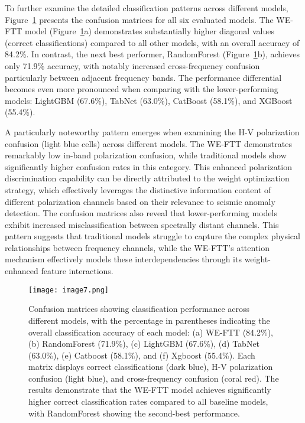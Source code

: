 \documentclass[fleqn,10pt]{wlscirep_mdpi_style}
\begin{document}
To further examine the detailed classification patterns across different models, Figure~\ref{fig:fig7} presents the confusion matrices for all six evaluated models. The WE-FTT model (Figure~\ref{fig:fig7}a) demonstrates substantially higher diagonal values (correct classifications) compared to all other models, with an overall accuracy of 84.2\%. In contrast, the next best performer, RandomForest (Figure~\ref{fig:fig7}b), achieves only 71.9\% accuracy, with notably increased cross-frequency confusion particularly between adjacent frequency bands. The performance differential becomes even more pronounced when comparing with the lower-performing models: LightGBM (67.6\%), TabNet (63.0\%), CatBoost (58.1\%), and XGBoost (55.4\%).

A particularly noteworthy pattern emerges when examining the H-V polarization confusion (light blue cells) across different models. The WE-FTT demonstrates remarkably low in-band polarization confusion, while traditional models show significantly higher confusion rates in this category. This enhanced polarization discrimination capability can be directly attributed to the weight optimization strategy, which effectively leverages the distinctive information content of different polarization channels based on their relevance to seismic anomaly detection.
The confusion matrices also reveal that lower-performing models exhibit increased misclassification between spectrally distant channels. This pattern suggests that traditional models struggle to capture the complex physical relationships between frequency channels, while the WE-FTT's attention mechanism effectively models these interdependencies through its weight-enhanced feature interactions.

\begin{figure}[!htbp]
\centering
 \texttt{[image: image7.png]}
\caption{Confusion matrices showing classification performance across different models, with the percentage in parentheses indicating the overall classification accuracy of each model: (a) WE-FTT (84.2\%), (b) RandomForest (71.9\%), (c) LightGBM (67.6\%), (d) TabNet (63.0\%), (e) Catboost (58.1\%), and (f) Xgboost (55.4\%). Each matrix displays correct classifications (dark blue), H-V polarization confusion (light blue), and cross-frequency confusion (coral red). The results demonstrate that the WE-FTT model achieves significantly higher correct classification rates compared to all baseline models, with RandomForest showing the second-best performance.}
\label{fig:fig7}
\end{figure}
\end{document}
